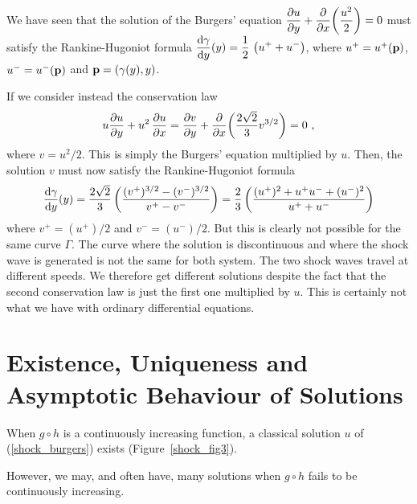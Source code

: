 \begin{egg}
We have seen that the solution of the Burgers' equation     \label{eggNonEquiv}
$\displaystyle \pdydx{u}{y} + \pdfdx{\left(\frac{u^2}{2}\right)}{x} = 0$
must satisfy the Rankine-Hugoniot formula
$\displaystyle \dydx{\gamma}{y}(y)
= \frac{1}{2} \, \left(u^+ + u^-\right)$, where
$u^+ = u^+(\VEC{p})$, $u^- = u^-(\VEC{p})$
and $\VEC{p}=(\gamma(y),y)$.

If we consider instead the conservation law
\[
u \pdydx{u}{y} + u^2\,\pdydx{u}{x}
= \pdydx{v}{y} + \pdfdx{\left(\frac{2\sqrt{2}}{3} v^{3/2}\right)}{x} = 0 \ ,
\]
where $v = u^2/2$.  This is simply the Burgers' equation multiplied by
$u$.  Then, the solution $v$ must now satisfy the Rankine-Hugoniot formula
\[
\dydx{\gamma}{y}(y)
= \frac{2\sqrt{2}}{3} \left( \frac{(v^+)^{3/2} - (v^-)^{3/2}} {v^+ - v^-}
\right)
= \frac{2}{3} \left(\frac{(u^+)^2 + u^+ u^- + (u^-)^2}{u^+ + u^-}\right)
\]
where $v^+ = (u^+)/2$ and $v^- = (u^-)/2$.  But this is clearly not
possible for the same curve $\Gamma$.  The curve where the solution is
discontinuous and where the shock wave is generated is not the same
for both system.  The two shock waves travel at different speeds.
We therefore get different solutions despite the fact that the second
conservation law is just the first one multiplied by $u$.  This is
certainly not what we have with ordinary differential equations.
\end{egg}

\section{Existence, Uniqueness and Asymptotic Behaviour of Solutions}

When $g \circ h$ is a continuously increasing function, a classical
solution $u$ of (\ref{shock_burgers}) exists (Figure~\ref{shock_fig3}).


However, we may, and often have, many solutions when
$g \circ h$ fails to be continuously increasing.

